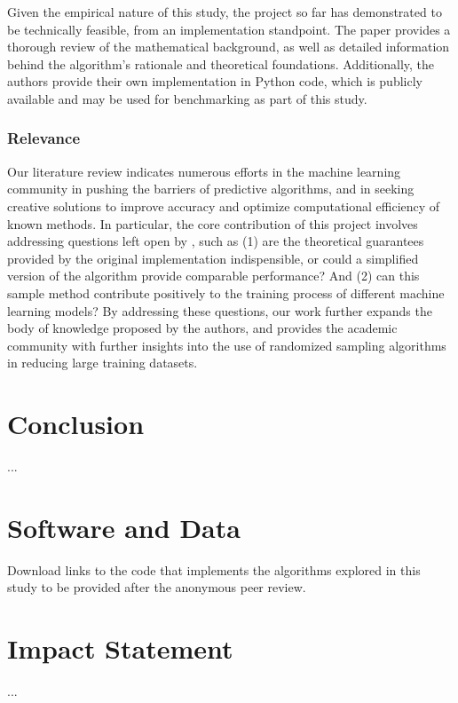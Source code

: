 \documentclass{article}
\theoremstyle{plain}
\theoremstyle{definition}
\theoremstyle{remark}
\begin{document}
Given the empirical nature of this study, the project so far has demonstrated to be technically feasible, from an implementation standpoint. The paper \cite{chow24} provides a thorough review of the mathematical background, as well as detailed information behind the algorithm's rationale and theoretical foundations. Additionally, the authors provide their own implementation in Python code, which is publicly available and may be used for benchmarking as part of this study.


\subsubsection{Relevance}

Our literature review indicates numerous efforts in the machine learning community in pushing the barriers of predictive algorithms, and in seeking creative solutions to improve accuracy and optimize computational efficiency of known methods. In particular, the core contribution of this project involves addressing questions left open by \citeauthor{chow24}, such as (1) are the theoretical guarantees provided by the original implementation indispensible, or could a simplified version of the algorithm provide comparable performance? And (2) can this sample method contribute positively to the training process of different machine learning models? By addressing these questions, our work further expands the body of knowledge proposed by the authors, and provides the academic community with further insights into the use of randomized sampling algorithms in reducing large training datasets.


\section{Conclusion}

...


\section*{Software and Data}

Download links to the code that implements the algorithms explored in this study to be provided after the anonymous peer review.

\section*{Impact Statement}

...
\end{document}

